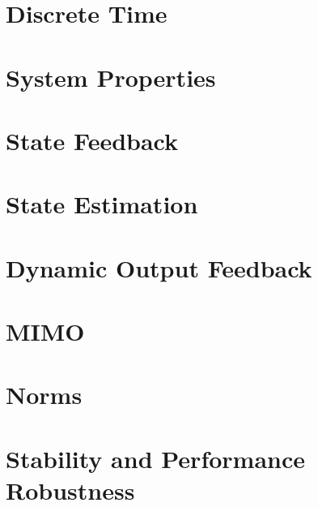 \documentclass[numerate]{cheatsheet}
\author{Noa Sendlhofer - nsendlhofer@ethz.ch}
\begin{document}
\section{Discrete Time}
	
	
	
	
	
\section{System Properties}
	
	
	
	
	
\section{State Feedback}
	
	
\section{State Estimation}
	
	
\section{Dynamic Output Feedback}
	
\section{MIMO}
	
	
	
	
	
\section{Norms}
	
	
	
	
	\columnbreak
\section{Stability and Performance Robustness}
	
	
	
\end{document}
